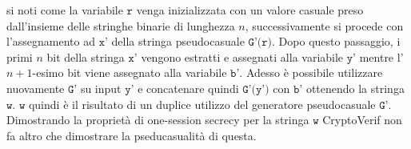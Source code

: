 \documentclass[a4paper,openright,twoside,12pt]{report}
\begin{document}
si noti come la variabile $\texttt{r}$ venga inizializzata con un valore casuale preso dall'insieme delle stringhe binarie di lunghezza $n$, successivamente si procede con l'assegnamento ad $\texttt{x'}$ della stringa pseudocasuale
$\texttt{G'(r)}$. Dopo questo passaggio, i primi $n$ bit della stringa $\texttt{x'}$ vengono estratti e assegnati alla variabile $\texttt{y'}$ mentre l'$n+1$-esimo bit viene assegnato alla variabile 
$\texttt{b'}$. Adesso \`e possibile utilizzare nuovamente $\texttt{G'}$ su input $\texttt{y'}$ e concatenare quindi $\texttt{G'(y')}$ con $\texttt{b'}$ ottenendo la stringa $\texttt{w}$.
$\texttt{w}$ quindi \`e il risultato di un duplice utilizzo del generatore pseudocasuale $\texttt{G'}$. Dimostrando la propriet\`a di one-session secrecy per la stringa $\texttt{w}$ CryptoVerif
non fa altro che dimostrare la pseducasualit\`a di questa.
\newpage
\end{document}
